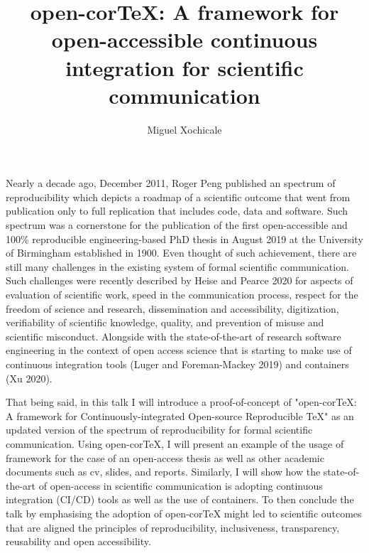 \documentclass[11pt]{article}
\title{
open-corTeX: A framework for open-accessible continuous integration for scientific communication
}
\author{Miguel Xochicale}
\date{\DTMNow}
\begin{document}
\maketitle
Nearly a decade ago, December 2011, Roger Peng published an spectrum of reproducibility 
which depicts a roadmap of a scientific outcome
that went from publication only to full replication that includes code, data and software.
Such spectrum was a cornerstone for 
the publication of the first open-accessible 
and 100\% reproducible engineering-based PhD thesis in August 2019 
at the University of Birmingham established in 1900.
Even thought of such achievement, there are still many challenges in the existing system 
of formal scientific communication.
Such challenges were recently described by Heise and Pearce 2020
for aspects of evaluation of scientific work, 
speed in the communication process,
respect for the freedom of science and research,
dissemination and accessibility, digitization,
verifiability of scientific knowledge, quality, 
and prevention of misuse and scientific misconduct.
Alongside with the state-of-the-art of research software engineering
in the context of open access science that is starting to make use 
of continuous integration tools 
(Luger and Foreman-Mackey 2019) and 
containers (Xu 2020).

That being said, in this talk I will introduce a proof-of-concept of 
"open-corTeX: A framework for Continuously-integrated Open-source Reproducible TeX" 
as an updated version of the spectrum of reproducibility for 
formal scientific communication.
Using open-corTeX, I will present an example of the usage of framework 
for the case of an open-access thesis 
as well as other academic documents such as cv, slides, and reports. 
Similarly, I will show how the state-of-the-art of open-access in scientific 
communication is adopting continuous integration (CI/CD) tools
as well as the use of containers.
To then conclude the talk by emphasising 
the adoption of open-corTeX might led to scientific outcomes 
that are aligned the principles of 
reproducibility, inclusiveness, transparency,
reusability  and open accessibility.

\end{document}
